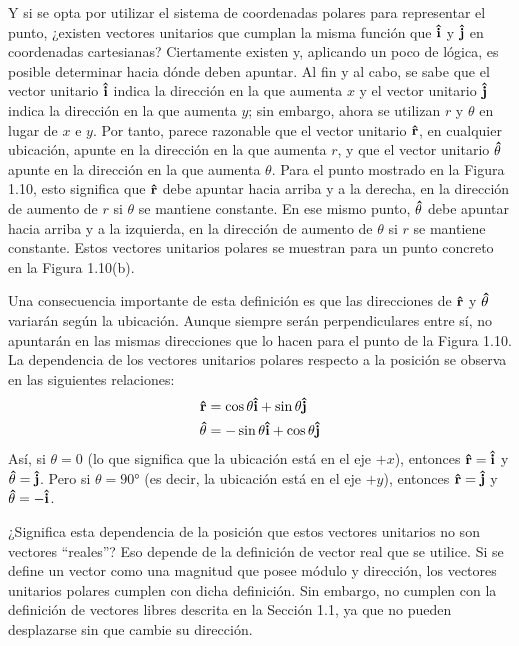 \documentclass[hidelinks,12pt]{article}
\begin{document}
Y si se opta por utilizar el sistema de coordenadas polares para representar el punto, ¿existen vectores unitarios que cumplan la misma función que $\vu{i}$ y $\vu{j}$ en coordenadas cartesianas? Ciertamente existen y, aplicando un poco de lógica, es posible determinar hacia dónde deben apuntar. Al fin y al cabo, se sabe que el vector unitario $\vu{i}$ indica la dirección en la que aumenta $x$ y el vector unitario $\vu{j}$ indica la dirección en la que aumenta $y$; sin embargo, ahora se utilizan $r$ y $\theta$ en lugar de $x$ e $y$. Por tanto, parece razonable que el vector unitario $\vu{r}$, en cualquier ubicación, apunte en la dirección en la que aumenta $r$, y que el vector unitario $\vu{\theta}$ apunte en la dirección en la que aumenta $\theta$. Para el punto mostrado en la Figura 1.10, esto significa que $\vu{r}$ debe apuntar hacia arriba y a la derecha, en la dirección de aumento de $r$ si $\theta$ se mantiene constante. En ese mismo punto, $\vu{\theta}$ debe apuntar hacia arriba y a la izquierda, en la dirección de aumento de $\theta$ si $r$ se mantiene constante. Estos vectores unitarios polares se muestran para un punto concreto en la Figura 1.10(b).
\par
Una consecuencia importante de esta definición es que las direcciones de $\vu{r}$ y $\vu{\theta}$ variarán según la ubicación. Aunque siempre serán perpendiculares entre sí, no apuntarán en las mismas direcciones que lo hacen para el punto de la Figura 1.10. La dependencia de los vectores unitarios polares respecto a la posición se observa en las siguientes relaciones:
\begin{align}
\begin{aligned}
    \vu{r} &= \cos \theta \vu{i} + \sin \theta \vu{j} \\
    \vu{\theta} &= - \sin \theta \vu{i} + \cos \theta \vu{j}
\end{aligned}
\label{eq:ecuacion_01_11}
\end{align}
Así, si $\theta = 0$ (lo que significa que la ubicación está en el eje $+x$), entonces $\vu{r} = \vu{i}$ y $\vu{\theta} = \vu{j}$. Pero si $\theta = \ang{90}$ (es decir, la ubicación está en el eje $+y$), entonces $\vu{r} = \vu{j}$ y $\vu{\theta} = -\vu{i}$.
\par
¿Significa esta dependencia de la posición que estos vectores unitarios no son vectores \enquote{reales}? Eso depende de la definición de vector real que se utilice. Si se define un vector como una magnitud que posee módulo y dirección, los vectores unitarios polares cumplen con dicha definición. Sin embargo, no cumplen con la definición de vectores libres descrita en la Sección 1.1, ya que no pueden desplazarse sin que cambie su dirección.
\end{document}
